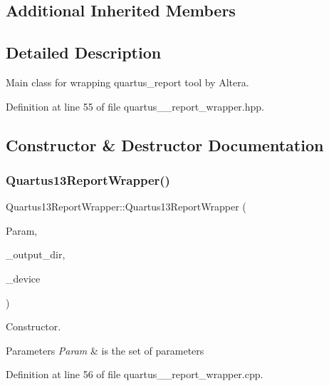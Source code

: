 \subsection*{Additional Inherited Members}


\subsection{Detailed Description}
Main class for wrapping quartus\+\_\+report tool by Altera. 

Definition at line 55 of file quartus\+\_\+\_\+report\+\_\+wrapper.\+hpp.



\subsection{Constructor \& Destructor Documentation}
\mbox{\label{classQuartus13ReportWrapper_a3a425105ef70ba5ad1d78ab9f6e2538b}} 
\subsubsection{\texorpdfstring{Quartus13\+Report\+Wrapper()}{Quartus13ReportWrapper()}}
{\footnotesize\ttfamily Quartus13\+Report\+Wrapper\+::\+Quartus13\+Report\+Wrapper (\begin{DoxyParamCaption}\item[{const \hyperlink{Parameter_8hpp_a37841774a6fcb479b597fdf8955eb4ea}{Parameter\+Const\+Ref} \&}]{Param,  }\item[{const std\+::string \&}]{\+\_\+output\+\_\+dir,  }\item[{const \hyperlink{target__device_8hpp_acedb2b7a617e27e6354a8049fee44eda}{target\+\_\+device\+Ref} \&}]{\+\_\+device }\end{DoxyParamCaption})}



Constructor. 


\begin{DoxyParams}{Parameters}
{\em Param} & is the set of parameters \\
\hline
\end{DoxyParams}


Definition at line 56 of file quartus\+\_\+\_\+report\+\_\+wrapper.\+cpp.



